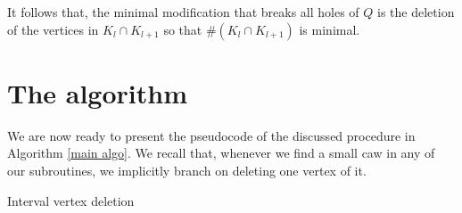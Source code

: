 \documentclass{article}
\theoremstyle{definition}
\begin{document}
    It follows that,
    the minimal modification
    that breaks all holes of $Q$ 
    is the deletion of the
    vertices in $K_{l} \cap K_{l+1}$ 
    so that $\# \left(K_{l} \cap K_{l+1}\right)$
    is minimal.

    \section{The algorithm}
    
    We are now ready to
    present the pseudocode
    of the discussed procedure in
    Algorithm \ref{main algo}.
    We recall that, whenever
    we find a small caw in
    any of our subroutines,
    we implicitly branch
    on deleting one vertex of it.

    \begin{algorithm} \label{main algo}
        \caption{Interval vertex deletion}



  
        \vspace{5pt}

\end{algorithm}
\end{document}
